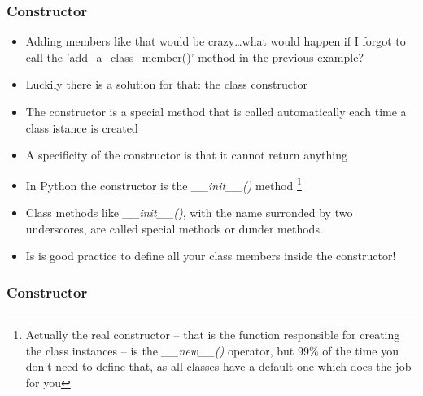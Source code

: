 \documentclass[9pt]{beamer}
\begin{document}
\begin{frame}
  \frametitle{Constructor}
  
  \begin{itemize}
    \small
    \item Adding members like that would be crazy\dots what would happen if I forgot
          to call the 'add\_a\_class\_member()' method in the previous example?
    \smallskip
    \item Luckily there is a solution for that: the class \alert{constructor}
    \smallskip
    \item The constructor is a special method that is called automatically each time
          a class istance is created
    \smallskip
    \item A specificity of the constructor is that it cannot return anything
    \smallskip
    \item In Python the constructor is the \emph{\_\_init\_\_()} method%
          \footnote{Actually the real constructor -- that is the function responsible for 
                    creating the class instances -- is the \emph{\_\_new\_\_()} operator, but 99\% of the time you don't need
                    to define that, as all classes have a default one which does the job for you}           
    \smallskip
    \item Class methods like \emph{\_\_init\_\_()}, with the name surronded by two underscores,
          are called \alert{special} methods or \alert{dunder} methods.
    \smallskip
    \item Is is good practice to define all your class members inside the constructor!

  \end{itemize}

\end{frame}


\begin{frame}
  \frametitle{Constructor}
  
\end{frame}
\end{document}
